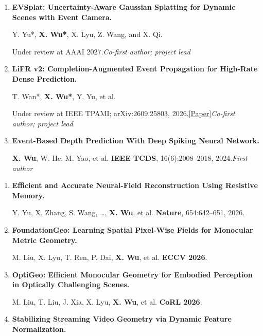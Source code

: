 \documentclass[a4paper]{article}
\newcommand{\pubgroup}[1]{%
  \par\vspace{3.8pt}{\color{cvblue}\fontsize{9.4}{10.4}\selectfont\bfseries #1}\par
}
\begin{document}
{\begin{enumerate}[leftmargin=1.6em,labelsep=0.38em,itemsep=1.5pt,topsep=1.3pt,parsep=0pt,partopsep=0pt]
\textbf{X. Wu}, X. Lyu, Y. Yu, B. Wang, Z. Wang, and X. Qi.\par
\textbf{ICLR 2026}.\quad\href{https://arxiv.org/abs/2603.21115}{\textcolor{cvblue}{[Paper]}}\hfill\textcolor{cvblue}{\textit{First author}}
\item \textbf{EVSplat: Uncertainty-Aware Gaussian Splatting for Dynamic Scenes with Event Camera.}\par
Y. Yu*, \textbf{X. Wu*\textdagger}, X. Lyu, Z. Wang, and X. Qi.\par
Under review at AAAI 2027.\hfill\textcolor{cvblue}{\textit{Co-first author; project lead}}
\item \textbf{LiFR v2: Completion-Augmented Event Propagation for High-Rate Dense Prediction.}\par
T. Wan*, \textbf{X. Wu*\textdagger}, Y. Yu, et al.\par
Under review at IEEE TPAMI; arXiv:2609.25803, 2026.\quad\href{https://arxiv.org/abs/2609.25803}{\textcolor{cvblue}{[Paper]}}\hfill\textcolor{cvblue}{\textit{Co-first author; project lead}}
\item \textbf{Event-Based Depth Prediction With Deep Spiking Neural Network.}\par
\textbf{X. Wu}, W. He, M. Yao, et al. \hfill \textbf{IEEE TCDS}, 16(6):2008--2018, 2024.\hfill\textcolor{cvblue}{\textit{First author}}
\end{enumerate}
\pubgroup{Collaborative Work}
\begin{enumerate}[resume,leftmargin=1.6em,labelsep=0.38em,itemsep=1.5pt,topsep=1.3pt,parsep=0pt,partopsep=0pt]
\item \textbf{Efficient and Accurate Neural-Field Reconstruction Using Resistive Memory.}\par
Y. Yu, X. Zhang, S. Wang, \ldots, \textbf{X. Wu}, et al. \hfill \textbf{Nature}, 654:642--651, 2026.
\item \textbf{FoundationGeo: Learning Spatial Pixel-Wise Fields for Monocular Metric Geometry.}\par
M. Liu, X. Lyu, T. Ren, P. Dai, \textbf{X. Wu}, et al. \hfill \textbf{ECCV 2026}.
\item \textbf{OptiGeo: Efficient Monocular Geometry for Embodied Perception in Optically Challenging Scenes.}\par
M. Liu, T. Liu, J. Xia, X. Lyu, \textbf{X. Wu}, et al. \hfill \textbf{CoRL 2026}.
\item \textbf{Stabilizing Streaming Video Geometry via Dynamic Feature Normalization.}\par

\end{enumerate}}
\end{document}
